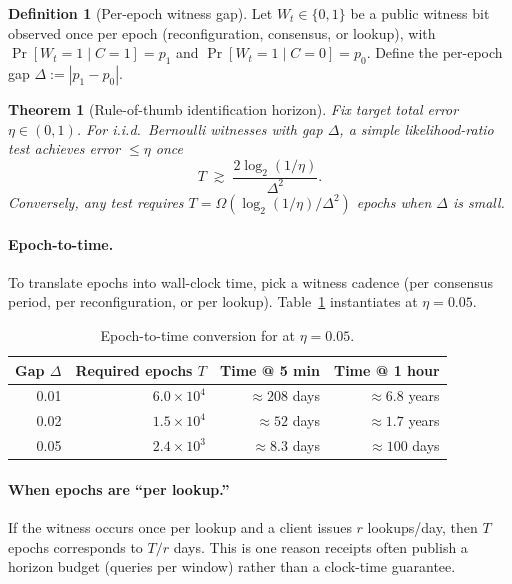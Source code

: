 \documentclass[11pt]{article}
\newtheorem{theorem}{Theorem}
\theoremstyle{definition}
\newtheorem{definition}{Definition}
\theoremstyle{remark}
\begin{document}
\begin{definition}[Per-epoch witness gap]
Let $W_t\in\{0,1\}$ be a public witness bit observed once per epoch (reconfiguration, consensus, or lookup),
with $\Pr[W_t=1\mid C=1]=p_1$ and $\Pr[W_t=1\mid C=0]=p_0$.
Define the per-epoch gap $\Delta := |p_1-p_0|$.
\end{definition}

\begin{theorem}[Rule-of-thumb identification horizon]\label{thm:repeat-witness}
Fix target total error $\eta\in(0,1)$.
For i.i.d.\ Bernoulli witnesses with gap $\Delta$, a simple likelihood-ratio test achieves error $\le \eta$ once
\[
T \;\gtrsim\; \frac{2\log_2(1/\eta)}{\Delta^2}.
\]
Conversely, any test requires $T=\Omega(\log_2(1/\eta)/\Delta^2)$ epochs when $\Delta$ is small.
\end{theorem}

\paragraph{Epoch-to-time.}
To translate epochs into wall-clock time, pick a witness cadence (per consensus period, per reconfiguration, or per lookup).
Table~\ref{tab:vignette-times} instantiates  at $\eta=0.05$.

\begin{table}[t]
\centering
\begin{tabular}{@{}r r r r@{}}
\toprule
Gap $\Delta$ & Required epochs $T$ & Time @ 5 min & Time @ 1 hour \\
\midrule
0.01 & $6.0\times 10^{4}$ & $\approx 208$ days & $\approx 6.8$ years \\
0.02 & $1.5\times 10^{4}$ & $\approx 52$ days & $\approx 1.7$ years \\
0.05 & $2.4\times 10^{3}$ & $\approx 8.3$ days & $\approx 100$ days \\
\bottomrule
\end{tabular}
\caption{Epoch-to-time conversion for  at $\eta=0.05$.}
\label{tab:vignette-times}
\end{table}

\paragraph{When epochs are ``per lookup.''}
If the witness occurs once per lookup and a client issues $r$ lookups/day, then $T$ epochs corresponds to $T/r$ days.
This is one reason receipts often publish a horizon budget (queries per window) rather than a clock-time guarantee.
\end{document}

